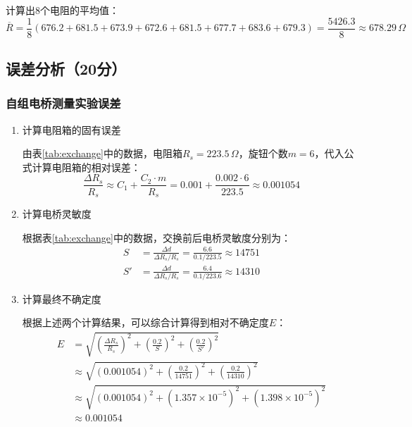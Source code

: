 \documentclass[]{../../templates/Report}%
\begin{document}
\begin{fullreportonly}
计算出8个电阻的平均值：
\begin{equation}
    \overline{R} = \frac{1}{8} (676.2 + 681.5 + 673.9 + 672.6 + 681.5 + 677.7 + 683.6 + 679.3) = \frac{5426.3}{8} \approx 678.29\,\Omega
\end{equation}


\subsection{误差分析（20分）}

\subsubsection{自组电桥测量实验误差}
\begin{enumerate}
    \item 计算电阻箱的固有误差
    
    由表\ref{tab:exchange}中的数据，电阻箱$R_s=223.5\,\Omega$，旋钮个数$m=6$，代入公式计算电阻箱的相对误差：
    \begin{equation}
        \frac{\Delta R_s}{R_s} \approx C_1 + \frac{C_2 \cdot m}{R_s} = 0.001 + \frac{0.002 \cdot 6}{223.5} \approx 0.001054
    \end{equation}

    \item 计算电桥灵敏度
    
    根据表\ref{tab:exchange}中的数据，交换前后电桥灵敏度分别为：
    \begin{align*}
        S &= \frac{\Delta d}{\Delta R_s / R_s} = \frac{6.6}{0.1 / 223.5} \approx 14751 \\
        S' &= \frac{\Delta d}{\Delta R_s / R_s} = \frac{6.4}{0.1 / 223.6} \approx 14310
    \end{align*}

    \item 计算最终不确定度
        
    根据上述两个计算结果，可以综合计算得到相对不确定度$E$：
    \begin{align*}
        E &= \sqrt{\left(\frac{\Delta R_s}{R_s}\right)^2 + \left(\frac{0.2}{S}\right)^2 + \left(\frac{0.2}{S'}\right)^2} \\
          &\approx \sqrt{(0.001054)^2 + \left(\frac{0.2}{14751}\right)^2 + \left(\frac{0.2}{14310}\right)^2} \\
          &\approx \sqrt{(0.001054)^2 + (1.357 \times 10^{-5})^2 + (1.398 \times 10^{-5})^2} \\
          &\approx 0.001054
    \end{align*}
    

\end{enumerate}
\end{fullreportonly}
\end{document}
